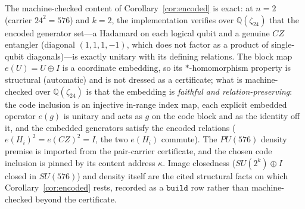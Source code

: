 The machine-checked content of Corollary~\ref{cor:encoded} is exact: at $n = 2$ (carrier $24^2 = 576$) and $k = 2$, the implementation verifies over $\mathbb{Q}(\zeta_{24})$ that the encoded generator set---a Hadamard on each logical qubit and a genuine $CZ$ entangler (diagonal $(1,1,1,-1)$, which does not factor as a product of single-qubit diagonals)---is exactly unitary with its defining relations. The block map $e(U) = U\oplus I$ is a coordinate embedding, so its $*$-homomorphism property is structural (automatic) and is not dressed as a certificate; what is machine-checked over $\mathbb{Q}(\zeta_{24})$ is that the embedding is \emph{faithful and relation-preserving}: the code inclusion is an injective in-range index map, each explicit embedded operator $e(g)$ is unitary and acts as $g$ on the code block and as the identity off it, and the embedded generators satisfy the encoded relations (${e(H_i)}^2 = {e(CZ)}^2 = I$, the two $e(H_i)$ commute). The $PU(576)$ density premise is imported from the pair-carrier certificate, and the chosen code inclusion is pinned by its content address $\kappa$. Image closedness ($SU(2^{k})\oplus I$ closed in $SU(576)$) and density itself are the cited structural facts on which Corollary~\ref{cor:encoded} rests, recorded as a $\texttt{build}$ row rather than machine-checked beyond the certificate.
